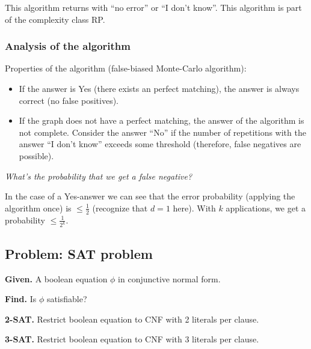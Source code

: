 \documentclass[a4paper]{article}
\newcommand{\given}[1]{\textbf{Given.} #1\par}
\newcommand{\find}[1]{\textbf{Find.} #1\par}
\newcommand{\cls}[1]{\rm{#1}}
\newenvironment{spec}[0]{\begin{framed}}{\end{framed}}
\begin{document}
This algorithm returns with ``no error'' or ``I don't know''.
This algorithm is part of the complexity class \cls{RP}.

\subsubsection{Analysis of the algorithm}
%
Properties of the algorithm (false-biased Monte-Carlo algorithm):
\begin{itemize}
  \item If the answer is Yes (there exists an perfect matching), the answer is always correct (no false positives).
  \item
    If the graph does not have a perfect matching, the answer of the algorithm is not complete.
    Consider the answer ``No'' if the number of repetitions with the answer ``I don't know'' exceeds
    some threshold (therefore, false negatives are possible).
\end{itemize}

\emph{What's the probability that we get a false negative?}

In the case of a Yes-answer we can see that the error probability (applying the algorithm once)
is $\leq \frac12$ (recognize that $d=1$ here).
With $k$ applications, we get a probability $\leq \frac{1}{2^k}$.

\subsection{Problem: SAT problem}
\label{sec:sat-algorithm}
%
\begin{spec}
  \given{A boolean equation $\phi$ in conjunctive normal form.}
  \find{Is $\phi$ satisfiable?}
  \textbf{2-SAT.} Restrict boolean equation to CNF with 2 literals per clause. \par
  \textbf{3-SAT.} Restrict boolean equation to CNF with 3 literals per clause. \par
\end{spec}
\end{document}
